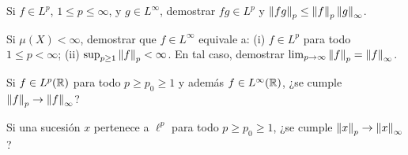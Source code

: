 \begin{ejercicio}\label{ej:v2-l22-4}
Si $f\in L^p$, $1\le p\le\infty$, y $g\in L^\infty$, demostrar $fg\in L^p$ y $\left\lVert fg\right\rVert_p\le\left\lVert f\right\rVert_p\left\lVert g\right\rVert_\infty$.
\end{ejercicio}

\begin{ejercicio}\label{ej:v2-l22-5}
Si $\mu(X)<\infty$, demostrar que $f\in L^\infty$ equivale a: (i) $f\in L^p$ para todo $1\le p<\infty$; (ii) $\sup_{p\ge1}\left\lVert f\right\rVert_p<\infty$. En tal caso, demostrar $\lim_{p\to\infty}\left\lVert f\right\rVert_p=\left\lVert f\right\rVert_\infty$.
\end{ejercicio}

\begin{ejercicio}\label{ej:v2-l22-6}
Si $f\in L^p(\mathbb R)$ para todo $p\ge p_0\ge1$ y además $f\in L^\infty(\mathbb R)$, ¿se cumple $\left\lVert f\right\rVert_p\to\left\lVert f\right\rVert_\infty$?
\end{ejercicio}

\begin{ejercicio}\label{ej:v2-l22-7}
Si una sucesión $x$ pertenece a $\ell^p$ para todo $p\ge p_0\ge1$, ¿se cumple $\left\lVert x\right\rVert_p\to\left\lVert x\right\rVert_\infty$?
\end{ejercicio}



